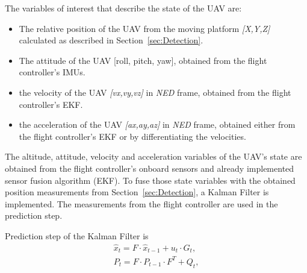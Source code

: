 \documentclass[conference]{IEEEtran}
\begin{document}
The variables of interest that describe the state of the UAV are:

%
\begin{itemize}

\item The relative position of the UAV from the moving platform \emph{[X,Y,Z]} calculated as described in Section~\ref{sec:Detection}.

\item The attitude of the UAV [roll, pitch, yaw], obtained from the flight controller's IMUs.

\item the velocity of the UAV \emph{[vx,vy,vz]} in \emph{NED} frame, obtained from the flight controller's EKF.


\item the acceleration of the UAV \emph{[ax,ay,az]} in \emph{NED} frame, obtained either from the flight controller's EKF or by differentiating the velocities.



\end{itemize}
%
The altitude, attitude, velocity and acceleration variables of the
UAV's state are obtained from the flight controller's onboard sensors
and already implemented sensor fusion algorithm (EKF). To fuse those
state variables with the obtained position measurements from
Section~\ref{sec:Detection}, a Kalman Filter is implemented. The
measurements from the flight controller are used in the prediction
step.


Prediction step of the Kalman Filter is
\begin{equation} 
 \begin{array}{l}
    \hat{x}_{t} = F \cdot \hat{x}_{t-1} + u_{t} \cdot G_{t}, \\ 
    P_{t} = F \cdot P_{t-1} \cdot F^T + Q_{t},
  \end{array}
\end{equation}
\end{document}
